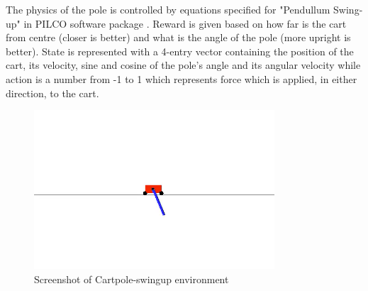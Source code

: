 The physics of the pole is controlled by equations specified for "Pendullum Swing-up" in PILCO software package \cite{pilco2013}. Reward is given based on how far is the cart from centre (closer is better) and what is the angle of the pole (more upright is better). State is represented with a 4-entry vector containing the position of the cart, its velocity, sine and cosine of the pole's angle and its angular velocity while action is a number from -1 to 1 which represents force which is applied, in either direction, to the cart.

\begin{figure}[h]
    \caption{Screenshot of Cartpole-swingup environment}
    \includegraphics[width=0.8\textwidth]{img/cartpole.png}
\end{figure}

